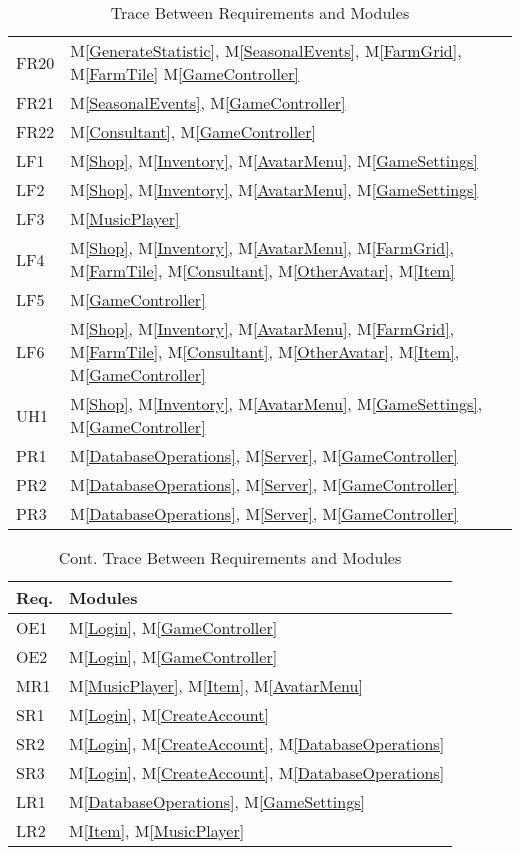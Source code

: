 \documentclass[12pt, titlepage]{article}
\newcommand{\mref}[1]{M\ref{#1}}
\begin{document}
\begin{table}[H]
\begin{tabular}{p{} p{}}
FR20 & \mref{GenerateStatistic}, \mref{SeasonalEvents}, \mref{FarmGrid}, \mref{FarmTile} \mref{GameController}\\
FR21 & \mref{SeasonalEvents}, \mref{GameController}\\
FR22 & \mref{Consultant}, \mref{GameController}\\
LF1& \mref{Shop}, \mref{Inventory}, \mref{AvatarMenu}, \mref{GameSettings}\\
LF2& \mref{Shop}, \mref{Inventory}, \mref{AvatarMenu}, \mref{GameSettings}\\
LF3& \mref{MusicPlayer}\\
LF4& \mref{Shop}, \mref{Inventory}, \mref{AvatarMenu}, \mref{FarmGrid}, \mref{FarmTile}, \mref{Consultant}, \mref{OtherAvatar}, \mref{Item}\\
LF5& \mref{GameController}\\
LF6 &\mref{Shop}, \mref{Inventory}, \mref{AvatarMenu}, \mref{FarmGrid}, \mref{FarmTile}, \mref{Consultant}, \mref{OtherAvatar}, \mref{Item}, \mref{GameController}\\
UH1& \mref{Shop}, \mref{Inventory}, \mref{AvatarMenu}, \mref{GameSettings}, \mref{GameController}\\
PR1& \mref{DatabaseOperations}, \mref{Server}, \mref{GameController}\\
PR2& \mref{DatabaseOperations}, \mref{Server}, \mref{GameController}\\
PR3& \mref{DatabaseOperations}, \mref{Server}, \mref{GameController}\\

\bottomrule
\end{tabular}
\caption{Trace Between Requirements and Modules}
\label{TblRT}
\end{table}

\begin{table}[H]
\centering
\begin{tabular}{p{} p{}}
\toprule
\textbf{Req.} & \textbf{Modules}\\
\midrule
OE1& \mref{Login}, \mref{GameController}\\
OE2& \mref{Login}, \mref{GameController}\\
MR1& \mref{MusicPlayer}, \mref{Item}, \mref{AvatarMenu}\\
SR1& \mref{Login}, \mref{CreateAccount}\\
SR2& \mref{Login}, \mref{CreateAccount}, \mref{DatabaseOperations}\\
SR3& \mref{Login}, \mref{CreateAccount}, \mref{DatabaseOperations}\\
LR1 & \mref{DatabaseOperations}, \mref{GameSettings}\\
LR2 & \mref{Item}, \mref{MusicPlayer}\\
\bottomrule
\end{tabular}
\caption{Cont. Trace Between Requirements and Modules}
\label{TblRT}
\end{table}
\end{document}
